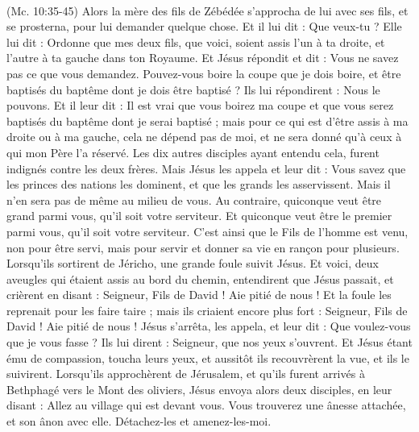\begin{multicols}{2}
{\\(Mc. 10:35-45)}
Alors la mère des fils de Zébédée s’approcha de lui avec ses fils, et se prosterna, pour lui demander quelque chose.
Et il lui dit : Que veux-tu ? Elle lui dit : Ordonne que mes deux fils, que voici, soient assis l'un à ta droite, et l'autre à ta gauche dans ton Royaume.
Et Jésus répondit et dit : Vous ne savez pas ce que vous demandez. Pouvez-vous boire la coupe que je dois boire, et être baptisés du baptême dont je dois être baptisé ? Ils lui répondirent : Nous le pouvons.
Et il leur dit : Il est vrai que vous boirez ma coupe et que vous serez baptisés du baptême dont je serai baptisé ; mais pour ce qui est d'être assis à ma droite ou à ma gauche, cela ne dépend pas de moi, et ne sera donné qu’à ceux à qui mon Père l’a réservé.
Les dix autres disciples ayant entendu cela, furent indignés contre les deux frères.
Mais Jésus les appela et leur dit : Vous savez que les princes des nations les dominent, et que les grands les asservissent.
Mais il n'en sera pas de même au milieu de vous. Au contraire, quiconque veut être grand parmi vous, qu'il soit votre serviteur.
Et quiconque veut être le premier parmi vous, qu'il soit votre serviteur.
C’est ainsi que le Fils de l'homme est venu, non pour être servi, mais pour servir et donner sa vie en rançon pour plusieurs.
Lorsqu’ils sortirent de Jéricho, une grande foule suivit Jésus.
Et voici, deux aveugles qui étaient assis au bord du chemin, entendirent que Jésus passait, et crièrent en disant : Seigneur, Fils de David ! Aie pitié de nous !
Et la foule les reprenait pour les faire taire ; mais ils criaient encore plus fort : Seigneur, Fils de David ! Aie pitié de nous !
Jésus s'arrêta, les appela, et leur dit : Que voulez-vous que je vous fasse ?
Ils lui dirent : Seigneur, que nos yeux s’ouvrent.
Et Jésus étant ému de compassion, toucha leurs yeux, et aussitôt ils recouvrèrent la vue, et ils le suivirent.
\VerseOne{}Lorsqu’ils approchèrent de Jérusalem, et qu'ils furent arrivés à Bethphagé vers le Mont des oliviers, Jésus envoya alors deux disciples,
en leur disant : Allez au village qui est devant vous. Vous trouverez une ânesse attachée, et son ânon avec elle. Détachez-les et amenez-les-moi.

\end{multicols}
